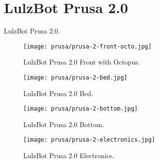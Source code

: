 %
%
%
%
%

\section{LulzBot Prusa 2.0}
LulzBot Prusa 2.0.

\begin{figure}[h!]
\texttt{[image: prusa/prusa-2-front-octo.jpg]}
 \caption{LulzBot Prusa 2.0 Front with Octopus.}
 \label{fig:prusa-2-front-octo}
\end{figure}


\begin{figure}[h!]
\texttt{[image: prusa/prusa-2-bed.jpg]}
 \caption{LulzBot Prusa 2.0 Bed.}
 \label{fig:prusa-2-bed}
\end{figure}

\begin{figure}[h!]
\texttt{[image: prusa/prusa-2-bottom.jpg]}
 \caption{LulzBot Prusa 2.0 Bottom.}
 \label{fig:prusa-2-bottom}
\end{figure}

\begin{figure}[h!]
\texttt{[image: prusa/prusa-2-electronics.jpg]}
 \caption{LulzBot Prusa 2.0 Electronics.}
 \label{fig:prusa-2-electronics}
\end{figure}


